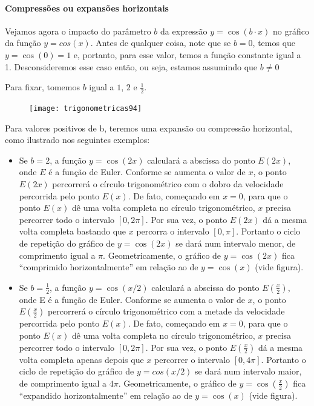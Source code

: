 \paragraph{Compressões ou expansões horizontais}

Vejamos agora o impacto do parâmetro $b$ da expressão $y=\cos(b\cdot x)$ no gráfico da função $y = cos(x)$. Antes de qualquer coisa, note que se $b=0$, temos que $y=\cos(0)=1$ e, portanto, para esse valor, temos a função constante igual a 1. Desconsideremos esse caso então, ou seja, estamos assumindo que $b\neq0$

Para fixar, tomemos $b$ igual a $1$, $2$ e $\frac{1}{2}$.


\begin{figure}[H]
\centering

\texttt{[image: trigonometricas94]}
\end{figure}

Para valores positivos de b, teremos uma expansão ou compressão horizontal, como ilustrado nos seguintes exemplos:

\begin{itemize}
\item Se $b = 2$, a função $y = \cos(2x)$ calculará a abscissa do ponto $E(2x)$, onde $E$ é a função de Euler. Conforme se aumenta o valor de $x$, o ponto $E(2x)$ percorrerá o círculo trigonométrico com o dobro da velocidade percorrida pelo ponto $E(x)$. De fato, começando em $x = 0$, para que o ponto $E(x)$ dê uma volta completa no círculo trigonométrico, $x$ precisa percorrer todo o intervalo $[0, 2\pi]$. Por sua vez, o ponto $E(2x)$ dá a mesma volta completa bastando que $x$ percorra o intervalo $[0, \pi]$. Portanto o ciclo de repetição do gráfico de $y =\cos(2x)$ se dará num intervalo menor, de comprimento igual a $\pi$. Geometricamente, o gráfico de $y = \cos(2x)$ fica “comprimido horizontalmente”{} em relação ao de $y = \cos(x)$ (vide figura).
	
\item Se $b = \frac{1}{2}$, a função $y = \cos(x/2)$ calculará a abscissa do ponto $E(\frac{x}{2})$, onde E é a função de Euler. Conforme se aumenta o valor de $x$, o ponto $E(\frac{x}{2})$ percorrerá o círculo trigonométrico com a metade da velocidade percorrida pelo ponto $E(x)$. De fato, começando em $x = 0$, para que o ponto $E(x)$ dê uma volta completa no círculo trigonométrico, $x$ precisa percorrer todo o intervalo $[0, 2\pi]$. Por sua vez, o ponto $E(\frac{x}{2})$ dá a mesma volta completa apenas depois que $x$ percorrer o intervalo $[0, 4\pi]$. Portanto o ciclo de repetição do gráfico de $y = cos(x/2)$ se dará num intervalo maior, de comprimento igual a $4\pi$. Geometricamente, o gráfico de $y = \cos(\frac{x}{2})$ fica “expandido horizontalmente”{} em relação ao de $y = \cos(x)$ (vide figura).
\end{itemize}


